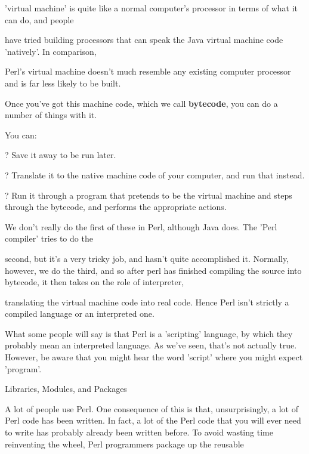 \documentclass[a4paper,11pt]{book}
\begin{document}
\noindent 'virtual machine'  is quite  like  a  normal  computer's  processor  in  terms  of  what it  can do,  and  people

\noindent have tried building  processors  that  can  speak  the  Java  virtual  machine  code  'natively'.  In  comparison,

\noindent Perl's virtual  machine  doesn't  much  resemble  any  existing  computer  processor  and is  far less  likely  to be built.

\noindent 

\noindent Once  you've got this machine  code,  which  we  call  \textbf{bytecode},  you  can  do  a  number  of  things  with it.

\noindent You can:

\noindent 

\noindent ? Save it away to be run later.

\noindent 

\noindent ? Translate it to the native machine code of your computer, and run that instead.

\noindent 

\noindent ? Run it through a program that pretends to be the virtual machine and steps through the bytecode, and performs the appropriate actions.

\noindent 

\noindent We don't really do the first of these in Perl, although Java does. The 'Perl compiler' tries to do the

\noindent second, but it's a very tricky job, and hasn't quite accomplished it. Normally, however, we do the third, and so after perl has finished compiling the source into bytecode, it then takes on the role of interpreter,

\noindent translating the virtual machine code into real code. Hence Perl isn't strictly a compiled language or an interpreted one.

\noindent 

\noindent What some people will say is that Perl is a 'scripting' language, by which they probably mean an interpreted language. As we've seen, that's not actually true. However, be aware that you might hear the word 'script' where you might expect 'program'.

\noindent 

\noindent Libraries, Modules, and Packages

\noindent 

\noindent A lot of people use Perl. One consequence of this is that, unsurprisingly, a lot of Perl code has been written. In fact, a lot of the Perl code that you will ever need to write has probably already been written before. To avoid wasting time reinventing the wheel, Perl programmers package up the reusable
\end{document}
